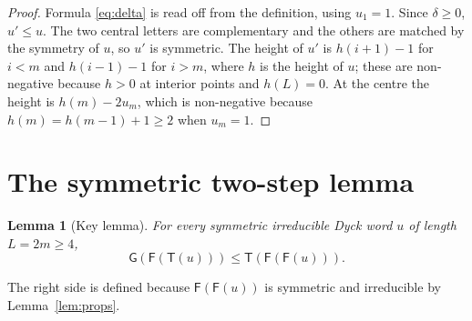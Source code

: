 \documentclass[11pt]{amsart}
\newtheorem{lemma}[proposition]{Lemma}
\theoremstyle{definition}
\theoremstyle{remark}
\numberwithin{equation}{section}
\newcommand{\cF}{\mathsf F}
\newcommand{\cG}{\mathsf G}
\newcommand{\cT}{\mathsf T}
\begin{document}
\begin{proof}
Formula \eqref{eq:delta} is read off from the definition, using $u_1=1$. Since $\delta\ge0$, $u'\le u$. The two central letters are complementary and the others are matched by the symmetry of $u$, so $u'$ is symmetric. The height of $u'$ is $h(i+1)-1$ for $i<m$ and $h(i-1)-1$ for $i>m$, where $h$ is the height of $u$; these are non-negative because $h>0$ at interior points and $h(L)=0$. At the centre the height is $h(m)-2u_m$, which is non-negative because $h(m)=h(m-1)+1\ge2$ when $u_m=1$.
\end{proof}

\section{The symmetric two-step lemma}\label{sec:lemma}

\begin{lemma}[Key lemma]\label{lem:key}
For every symmetric irreducible Dyck word $u$ of length $L=2m\ge4$,
\[
\cG(\cF(\cT(u)))\le\cT(\cF(\cF(u))).
\]
\end{lemma}

The right side is defined because $\cF(\cF(u))$ is symmetric and irreducible by Lemma~\ref{lem:props}.
\end{document}
